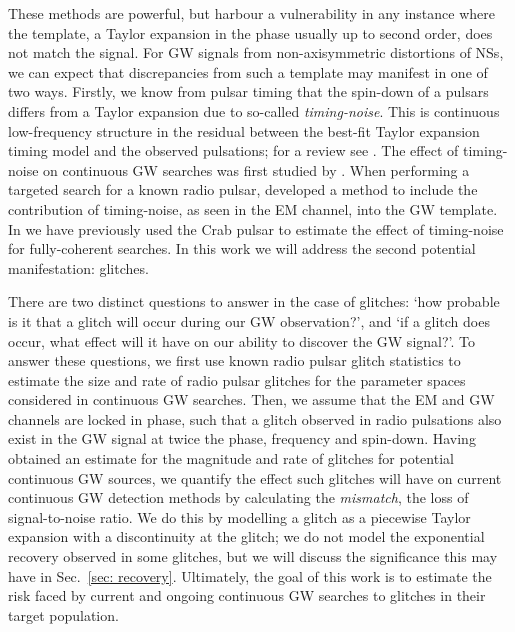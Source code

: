 \documentclass[../full_thesis/full_thesis.tex]{subfiles}
\begin{document}
These methods are powerful, but harbour a vulnerability in any instance where
the template, a Taylor expansion in the phase usually up to second order, does
not match the signal. For GW signals from non-axisymmetric distortions of NSs,
we can expect that discrepancies from such a template may manifest in one of
two ways. Firstly, we know from pulsar timing that the spin-down of a pulsars
differs from a Taylor expansion due to so-called \emph{timing-noise}. This is
continuous low-frequency structure in the residual between the best-fit Taylor
expansion timing model and the observed pulsations; for a review see
\citet{Hobbs2010}. The effect of timing-noise on continuous GW searches was
first studied by \citet{Jones2004}. When performing a targeted search for a
known radio pulsar, \citet{Pitkin2004} developed a method to include the
contribution of timing-noise, as seen in the EM channel, into the GW template. In
\citet{Ashton2015} we have previously used the Crab pulsar to estimate the
effect of timing-noise for fully-coherent searches. In this work we will
address the second potential manifestation: glitches.

There are two distinct questions to answer in the case of glitches: `how
probable is it that a glitch will occur during our GW observation?', and `if a
glitch does occur, what effect will it have on our ability to discover the
GW signal?'. To answer these questions, we first use known radio pulsar glitch
statistics to estimate the size and rate of radio pulsar glitches for the
parameter spaces considered in continuous GW searches. Then, we assume that the
EM and GW channels are locked in phase, such that a glitch observed in radio
pulsations also exist in the GW signal at twice the phase, frequency and
spin-down. Having obtained an estimate for the magnitude and rate of glitches
for potential continuous GW sources, we quantify the effect such glitches will have on
current continuous GW detection methods by calculating the \emph{mismatch}, the loss of
signal-to-noise ratio. We do this by modelling a glitch as a piecewise
Taylor expansion with a discontinuity at the glitch; we do not model the
exponential recovery observed in some glitches, but we will discuss the significance
this may have in Sec.~\ref{sec: recovery}. Ultimately, the goal of this
work is to estimate the risk faced by current and ongoing continuous GW
searches to glitches in their target population.

\end{document}
